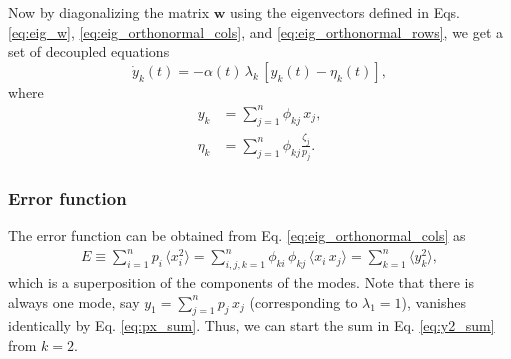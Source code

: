 \documentclass[reprint]{revtex4-1}
\newcommand{\Err}{E}
\begin{document}
Now by diagonalizing the matrix $\mathbf w$
using the eigenvectors defined in Eqs. \eqref{eq:eig_w},
\eqref{eq:eig_orthonormal_cols},
and
\eqref{eq:eig_orthonormal_rows},
we get a set of decoupled equations
%
\begin{equation}
\dot y_k(t)
=
-\alpha(t) \, \lambda_k \, [y_k(t) - \eta_k(t)],
\label{eq:yt_diffeq}
\end{equation}
%
where
\begin{align}
  y_k &= \sum_{j=1}^n \phi_{kj} \, x_j,
  \label{eq:y_def}
  \\
  \eta_k &= \sum_{j=1}^n \phi_{kj} \frac{ \zeta_j}{ p_j}.
  \label{eq:eta_def}
\end{align}



\subsubsection{Error function}



The error function can be obtained
from Eq. \eqref{eq:eig_orthonormal_cols}
as
\begin{align}
  \Err
  \equiv
  \sum_{i = 1}^n p_i \,
                 \langle x_i^2 \rangle
  =
  \sum_{i, j, k=1}^n \phi_{ki} \, \phi_{kj} \,
                     \langle x_i \, x_j \rangle
  =
  \sum_{k = 1}^n \langle y_k^2 \rangle,
  \label{eq:y2_sum}
\end{align}
%
which is a superposition of the components of the modes.
%
Note that there is always one mode, say
$y_1 = \sum_{j=1}^n p_j \, x_j$
(corresponding to $\lambda_1 = 1$),
vanishes identically by Eq. \eqref{eq:px_sum}.
%
Thus, we can start the sum in Eq. \eqref{eq:y2_sum}
from $k = 2$.
\end{document}
